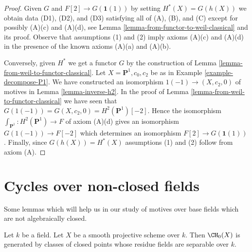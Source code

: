 \begin{proof}
Given $G$ and $F[2] \to G(\mathbf{1}(1))$ by setting $H^*(X) = G(h(X))$
we obtain data (D1), (D2), and (D3) satisfying all of (A), (B), and (C)
except for possibly (A)(c) and (A)(d), see
Lemma \ref{lemma-from-functor-to-weil-classical} and its proof.
Observe that assumptions (1) and (2) imply axioms (A)(c) and (A)(d)
in the presence of the known axioms (A)(a) and (A)(b).

\medskip\noindent
Conversely, given $H^*$ we get a functor $G$ by the construction of
Lemma \ref{lemma-from-weil-to-functor-classical}.
Let $X = \mathbf{P}^1, c_0, c_2$ be as in Example \ref{example-decompose-P1}.
We have constructed an isomorphism $1(-1) \to (X, c_2, 0)$ of motives in
Lemma \ref{lemma-inverse-h2}. In the proof of
Lemma \ref{lemma-from-weil-to-functor-classical} we have seen that
$G(1(-1)) = G(X, c_2, 0) = H^2(\mathbf{P}^1)[-2]$.
Hence the isomorphism $\int_{\mathbf{P}^1} : H^2(\mathbf{P}^1) \to F$
of axiom (A)(d) gives an isomorphism $G(1(-1)) \to F[-2]$ which
determines an isomorphism $F[2] \to G(\mathbf{1}(1))$.
Finally, since $G(h(X)) = H^*(X)$ assumptions (1) and (2)
follow from axiom (A).
\end{proof}











\section{Cycles over non-closed fields}
\label{section-cycles-nonclosed}

\noindent
Some lemmas which will help us in our study of motives
over base fields which are not algebraically closed.

\begin{lemma}
\label{lemma-generated-by-separable}
Let $k$ be a field. Let $X$ be a smooth projective scheme over $k$.
Then $\CH_0(X)$ is generated by classes of closed points whose residue
fields are separable over $k$.
\end{lemma}

